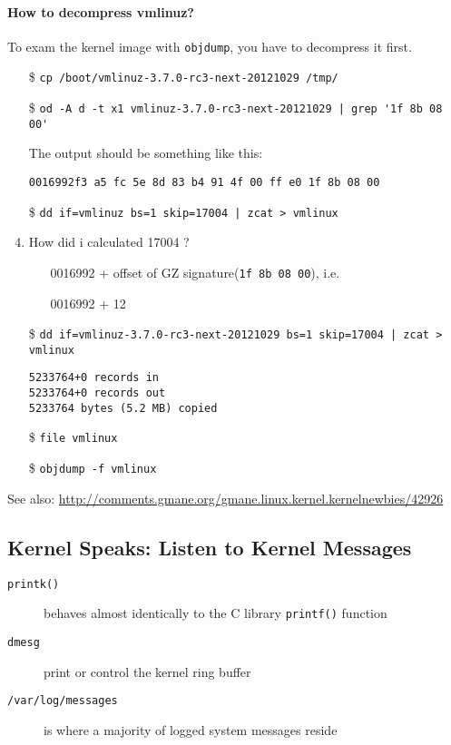 \paragraph{How to decompress vmlinuz?}

To exam the kernel image with \texttt{objdump}, you have to decompress it first.
\begin{enumerate}
\item[\$] \verb|cp /boot/vmlinuz-3.7.0-rc3-next-20121029 /tmp/|
\item[\$] \verb^od -A d -t x1 vmlinuz-3.7.0-rc3-next-20121029 | grep '1f 8b 08 00'^

  The output should be something like this:
  \begin{center}
    \texttt{0016992}\qquad\texttt{f3 a5 fc 5e 8d 83 b4 91 4f 00 ff e0 1f 8b 08 00}
  \end{center}
\item[\$] \verb^dd if=vmlinuz bs=1 skip=17004 | zcat > vmlinux^
\item How did i calculated 17004 ?
  \begin{itemize}
  \item[] 0016992 + offset of GZ signature(\texttt{1f 8b 08 00}), i.e.
  \item[] 0016992 + 12
  \end{itemize}
\item[\$] \verb^dd if=vmlinuz-3.7.0-rc3-next-20121029 bs=1 skip=17004 | zcat > vmlinux^
\begin{verbatim}
5233764+0 records in
5233764+0 records out
5233764 bytes (5.2 MB) copied
\end{verbatim}
\item[\$] \verb|file vmlinux|
\item[\$] \verb|objdump -f vmlinux|
\end{enumerate}

See also: \url{http://comments.gmane.org/gmane.linux.kernel.kernelnewbies/42926}

\subsection{Kernel Speaks: Listen to Kernel Messages}

\begin{frame}
  \begin{description}
  \item[\texttt{printk()}] behaves almost identically to the C library \texttt{printf()} function
  \item[\texttt{dmesg}] print or control the kernel ring buffer
  \item[\texttt{/var/log/messages}] is where a majority of logged system messages reside
  \end{description}
\end{frame}


